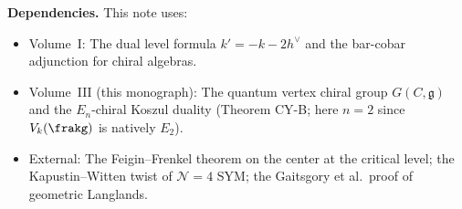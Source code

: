 \documentclass[11pt]{article}
\theoremstyle{definition}
\theoremstyle{remark}
\newcommand{\g}{\mathfrak{g}}
\newcommand{\hv}{h^\vee}
\begin{document}
\bigskip

\noindent\textbf{Dependencies.} This note uses:
\begin{itemize}
 \item Volume~I: The dual level formula $k' = -k - 2\hv$ and the bar-cobar
 adjunction for chiral algebras.
 \item Volume~III (this monograph): The quantum vertex chiral group $G(C,\g)$
 and the $E_n$-chiral Koszul duality (Theorem CY-B; here $n = 2$
 since $V_k(\frakg)$ is natively $E_2$).
 \item External: The Feigin--Frenkel theorem on the center at the critical
 level; the Kapustin--Witten twist of $\mathcal{N}=4$ SYM; the
 Gaitsgory et al.\ proof of geometric Langlands.
\end{itemize}
\end{document}
